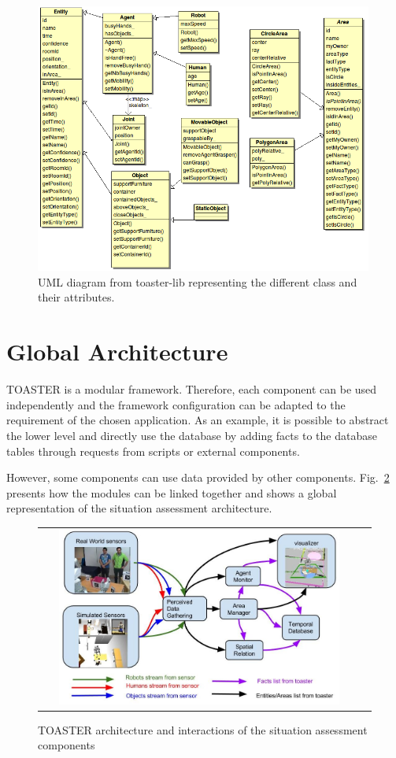 \documentclass[a4paper]{article}
\begin{document}
\begin{figure}
  \centering
  \includegraphics[width=0.99\textwidth]{img/uml_toasterLib.png}
  \caption{UML diagram from toaster-lib representing the different class and their attributes.}
  \label{fig:umltoasterlib}
\end{figure}

\section{Global Architecture}
\label{sec:architecture}
TOASTER is a modular framework. Therefore, each component can be used independently and the framework configuration can be adapted to the requirement of the chosen application.
As an example, it is possible to abstract the lower level and directly use the database by adding facts to the database tables through requests from scripts or external components.

However, some components can use data provided by other components. Fig.~\ref{fig:architecture} presents how the modules can be linked together and shows a global representation of the situation assessment architecture.

 \begin{figure}[ht!]
 \centering
 \begin{tabular}{cc}
  \includegraphics[width=0.9\textwidth]{img/toasterArch.jpg}
 \end{tabular}
 \caption{TOASTER architecture and interactions of the situation assessment components}
 \label{fig:architecture}
 \end{figure}
\end{document}
